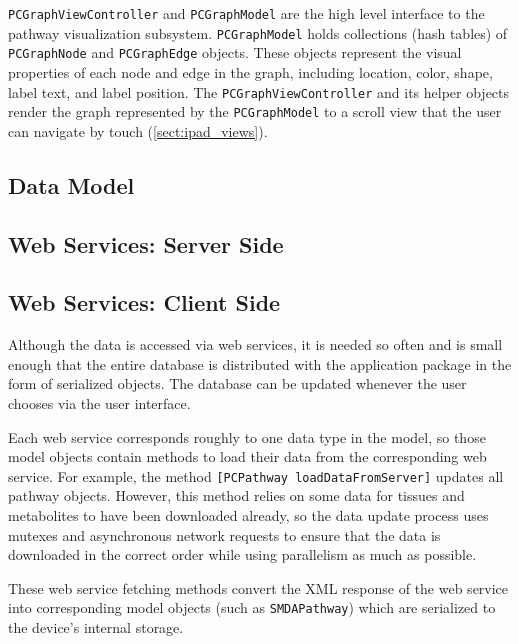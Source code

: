 \texttt{PCGraphViewController} and \texttt{PCGraphModel} are the high level
interface to the pathway visualization subsystem. \texttt{PCGraphModel} holds
collections (hash tables) of \texttt{PCGraphNode} and \texttt{PCGraphEdge}
objects. These objects represent the visual properties of each node and edge in
the graph, including location, color, shape, label text, and label position. The
\texttt{PCGraphViewController} and its helper objects render the graph
represented by the \texttt{PCGraphModel} to a scroll view
that the user can navigate by touch (\ref{sect:ipad_views}). 

\subsection{Data Model}
\label{sect:smda_data_model}



\subsection{Web Services: Server Side}
\label{sect:smda_web_services_server}

\subsection{Web Services: Client Side}
\label{sect:smda_web_services_client}

Although the data is accessed via web services, it is needed so often and is
small enough that the entire database is distributed with the application
package in the form of serialized objects. The database can be updated whenever
the user chooses via the user interface.

Each web service corresponds roughly to one data type in the model, so those
model objects contain methods to load their data from the corresponding web
service. For example, the method \texttt{[PCPathway loadDataFromServer]}
updates all pathway objects. However, this method relies on some data for
tissues and metabolites to have been downloaded already, so the data update
process uses mutexes and asynchronous network requests to ensure that the data
is downloaded in the correct order while using parallelism as much as possible.

These web service fetching methods convert the XML response of the web service
into corresponding model objects (such as \texttt{SMDAPathway}) which are
serialized to the device's internal storage.

